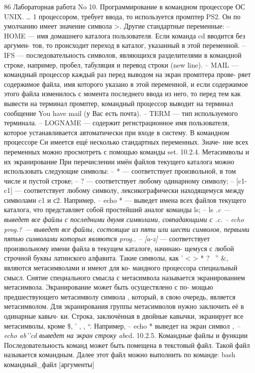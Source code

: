 \documentclass[
  letterpaper,
  DIV=11,
  numbers=noendperiod]{scrartcl}
\begin{document}
86 Лабораторная работа No 10. Программирование в командном процессоре ОС
UNIX. \ldots{} 1 процессором, требует ввода, то используется промптер
PS2. Он по умолчанию имеет значение символа \textgreater. Другие
стандартные переменные: -- HOME --- имя домашнего каталога пользователя.
Если команда cd вводится без аргумен- тов, то происходит переход в
каталог, указанный в этой переменной. -- IFS --- последовательность
символов, являющихся разделителями в командной строке, например, пробел,
табуляция и перевод строки (new line). -- MAIL --- командный процессор
каждый раз перед выводом на экран промптера прове- ряет содержимое
файла, имя которого указано в этой переменной, и если содержимое этого
файла изменилось с момента последнего ввода из него, то перед тем как
вывести на терминал промптер, командный процессор выводит на терминал
сообщение You have mail (у Вас есть почта). -- TERM --- тип
используемого терминала. -- LOGNAME --- содержит регистрационное имя
пользователя, которое устанавливается автоматически при входе в систему.
В командном процессоре Си имеется ещё несколько стандартных переменных.
Значе- ние всех переменных можно просмотреть с помощью команды set.
10.2.4. Метасимволы и их экранирование При перечислении имён файлов
текущего каталога можно использовать следующие символы: -- * ---
соответствует произвольной, в том числе и пустой строке; -- ? ---
соответствует любому одинарному символу; -- {[}c1-c1{]} ---
соответствует любому символу, лексикографически находящемуся между
символами c1 и с2. Например, -- echo * --- выведет имена всех файлов
текущего каталога, что представляет собой простейший аналог команды ls;
-- ls \emph{.c --- выведет все файлы с последними двумя символами,
совпадающими с .c. -- echo prog.? --- выведет все файлы, состоящие из
пяти или шести символов, первыми пятью символами которых являются prog..
-- {[}a-z{]}} --- соответствует произвольному имени файла в текущем
каталоге, начинаю- щемуся с любой строчной буквы латинского алфавита.
Такие символы, как ' \textless{} \textgreater{} * ? \textbar{} ~'' \&,
являются метасимволами и имеют для ко- мандного процессора специальный
смысл. Снятие специального смысла с метасимвола называется
экранированием метасимвола. Экранирование может быть осуществлено с по-
мощью предшествующего метасимволу символа , который, в свою очередь,
является метасимволом. Для экранирования группы метасимволов нужно
заключить её в одинарные кавыч- ки. Строка, заключённая в двойные
кавычки, экранирует все метасимволы, кроме \$, ' , , ``. Например, --
echo * выведет на экран символ \emph{, -- echo ab'}\textbar{}\emph{'cd
выведет на экран строку ab}\textbar*cd. 10.2.5. Командные файлы и
функции Последовательность команд может быть помещена в текстовый файл.
Такой файл называется командным. Далее этот файл можно выполнить по
команде: bash командный\_файл {[}аргументы{]}
\end{document}
